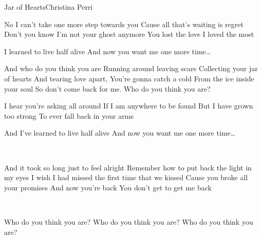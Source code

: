 \begin{Song}{Jar of Hearts}{Christina Perri}

\begin{multicols}{2}
\begin{Verse}
No I can't take one more step towards you
Cause all that's waiting is regret
Don't you know I'm not your ghost anymore
You lost the love I loved the most
\end{Verse}
\espaceInterStrophe

\begin{PreChorus}
I learned to live half alive
And now you want me one more time\dots
\end{PreChorus}
\espaceInterStrophe

\begin{Chorus}
And who do you think you are
Running around leaving scars
Collecting your jar of hearts
And tearing love apart,
You're gonna catch a cold
From the ice inside your soul
So don't come back for me.
Who do you think you are?
\end{Chorus}
\espaceInterStrophe

\begin{Verse}
I hear you're asking all around
If I am anywhere to be found
But I have grown too strong
To ever fall back in your arms
\end{Verse}
\espaceInterStrophe

\begin{PreChorus}
And I've learned to live half alive
And now you want me one more time\dots
\end{PreChorus}
\columnbreak

\\
\espaceInterStrophe

\begin{Bridge}
And it took so long just to feel alright
Remember how to put back the light in my eyes
I wish I had missed the first time that we kissed
Cause you broke all your promises
And now you're back
You don't get to get me back
\end{Bridge}
\espaceInterStrophe

\\

\bis

\begin{Chorus}
Who do you think you are?
Who do you think you are?
Who do you think you are?
\end{Chorus}

\end{multicols}
\vfill


\end{Song}
